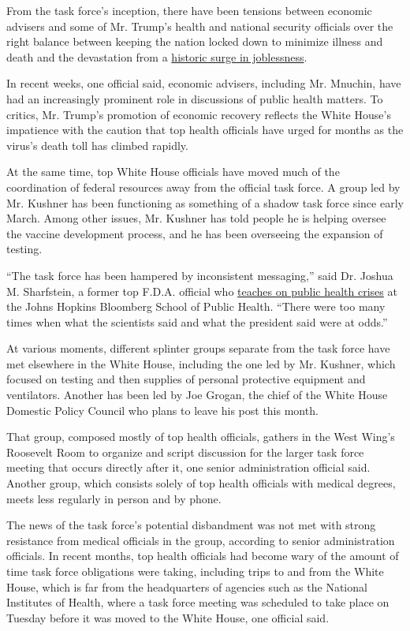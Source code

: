 From the task force's inception, there have been tensions between
economic advisers and some of Mr. Trump's health and national security
officials over the right balance between keeping the nation locked down
to minimize illness and death and the devastation from a
\href{https://www.nytimes3xbfgragh.onion/2020/04/30/business/economy/coronavirus-unemployment-claims.html}{historic
surge in joblessness}.

In recent weeks, one official said, economic advisers, including Mr.
Mnuchin, have had an increasingly prominent role in discussions of
public health matters. To critics, Mr. Trump's promotion of economic
recovery reflects the White House's impatience with the caution that top
health officials have urged for months as the virus's death toll has
climbed rapidly.

At the same time, top White House officials have moved much of the
coordination of federal resources away from the official task force. A
group led by Mr. Kushner has been functioning as something of a shadow
task force since early March. Among other issues, Mr. Kushner has told
people he is helping oversee the vaccine development process, and he has
been overseeing the expansion of testing.

``The task force has been hampered by inconsistent messaging,'' said Dr.
Joshua M. Sharfstein, a former top F.D.A. official who
\href{https://www.jhsph.edu/courses/course/28512/2019/300.650.01/crisis-and-response-in-public-health-policy-and-pr}{teaches
on public health crises} at the Johns Hopkins Bloomberg School of Public
Health. ``There were too many times when what the scientists said and
what the president said were at odds.''

At various moments, different splinter groups separate from the task
force have met elsewhere in the White House, including the one led by
Mr. Kushner, which focused on testing and then supplies of personal
protective equipment and ventilators. Another has been led by Joe
Grogan, the chief of the White House Domestic Policy Council who plans
to leave his post this month.

That group, composed mostly of top health officials, gathers in the West
Wing's Roosevelt Room to organize and script discussion for the larger
task force meeting that occurs directly after it, one senior
administration official said. Another group, which consists solely of
top health officials with medical degrees, meets less regularly in
person and by phone.

The news of the task force's potential disbandment was not met with
strong resistance from medical officials in the group, according to
senior administration officials. In recent months, top health officials
had become wary of the amount of time task force obligations were
taking, including trips to and from the White House, which is far from
the headquarters of agencies such as the National Institutes of Health,
where a task force meeting was scheduled to take place on Tuesday before
it was moved to the White House, one official said.

